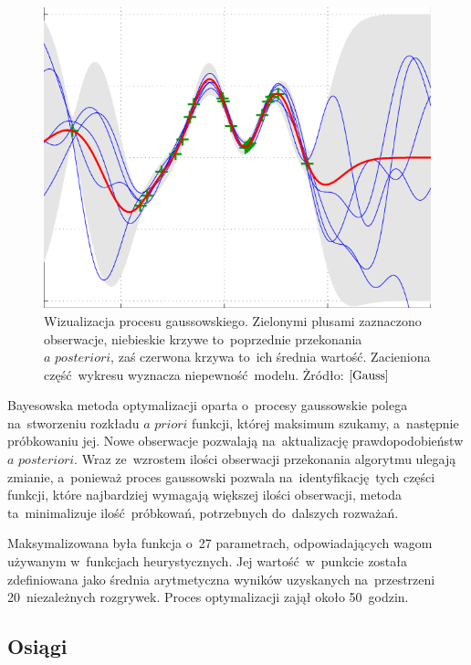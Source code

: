 \documentclass[declaration,shortabstract,inz]{iithesis}
\begin{document}
\begin{figure}[H]
	\centering
	\captionsetup{format=hang}
	\includegraphics[width=\textwidth,height=\textheight,keepaspectratio]{Gauss.png}
	\caption[Caption]{Wizualizacja procesu gaussowskiego. Zielonymi plusami zaznaczono obserwacje, niebieskie krzywe to~poprzednie przekonania $\textit{a posteriori}$, zaś czerwona krzywa to~ich średnia wartość. Zacieniona część wykresu wyznacza niepewność modelu. Żródło: $\cite{Gauss}$}
	\label{fig:Gauss}
\end{figure}

Bayesowska metoda optymalizacji oparta o~procesy gaussowskie polega na~stworzeniu rozkładu $\textit{a priori}$ funkcji, której maksimum szukamy, a~następnie próbkowaniu jej. Nowe obserwacje pozwalają na~aktualizację prawdopodobieństw $\textit{a posteriori}$. Wraz ze~wzrostem ilości obserwacji przekonania algorytmu ulegają zmianie, a~ponieważ proces gaussowski pozwala na~identyfikację tych części funkcji, które najbardziej wymagają większej ilości obserwacji, metoda ta~minimalizuje ilość próbkowań, potrzebnych do~dalszych rozważań.

Maksymalizowana była funkcja o~27 parametrach, odpowiadających wagom używanym w~funkcjach heurystycznych. Jej wartość w~punkcie została zdefiniowana jako średnia arytmetyczna wyników uzyskanych na~przestrzeni 20~niezależnych rozgrywek. Proces optymalizacji zajął około 50~godzin.

\subsection*{Osiągi}
\end{document}
